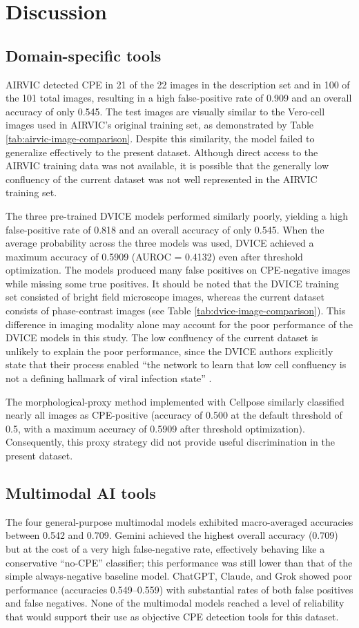 \section*{Discussion}
\label{sec:discussion}
\subsection*{Domain-specific tools}
AIRVIC detected CPE in 21 of the 22 images in the description set and in 100 of the 101 total images, resulting in a high false-positive rate of 0.909 and an overall accuracy of only 0.545. The test images are visually similar to the Vero-cell images used in AIRVIC’s original training set, as demonstrated by Table \ref{tab:airvic-image-comparison}. Despite this similarity, the model failed to generalize effectively to the present dataset. Although direct access to the AIRVIC training data was not available, it is possible that the generally low confluency of the current dataset was not well represented in the AIRVIC training set.

The three pre-trained DVICE models performed similarly poorly, yielding a high false-positive rate of 0.818 and an overall accuracy of only 0.545. When the average probability across the three models was used, DVICE achieved a maximum accuracy of 0.5909 (AUROC = 0.4132) even after threshold optimization. The models produced many false positives on CPE-negative images while missing some true positives. It should be noted that the DVICE training set consisted of bright field microscope images, whereas the current dataset consists of phase-contrast images (see Table \ref{tab:dvice-image-comparison}). This difference in imaging modality alone may account for the poor performance of the DVICE models in this study. The low confluency of the current dataset is unlikely to explain the poor performance, since the DVICE authors explicitly state that their process enabled ``the network to learn that low cell confluency is not a defining hallmark of viral infection state'' \cite{dvice}.

The morphological-proxy method implemented with Cellpose similarly classified nearly all images as CPE-positive (accuracy of 0.500 at the default threshold of 0.5, with a maximum accuracy of 0.5909 after threshold optimization). Consequently, this proxy strategy did not provide useful discrimination in the present dataset.

\subsection*{Multimodal AI tools}
The four general-purpose multimodal models exhibited macro-averaged accuracies between 0.542 and 0.709. Gemini achieved the highest overall accuracy (0.709) but at the cost of a very high false-negative rate, effectively behaving like a conservative ``no-CPE'' classifier; this performance was still lower than that of the simple always-negative baseline model. ChatGPT, Claude, and Grok showed poor performance (accuracies 0.549--0.559) with substantial rates of both false positives and false negatives. None of the multimodal models reached a level of reliability that would support their use as objective CPE detection tools for this dataset.

